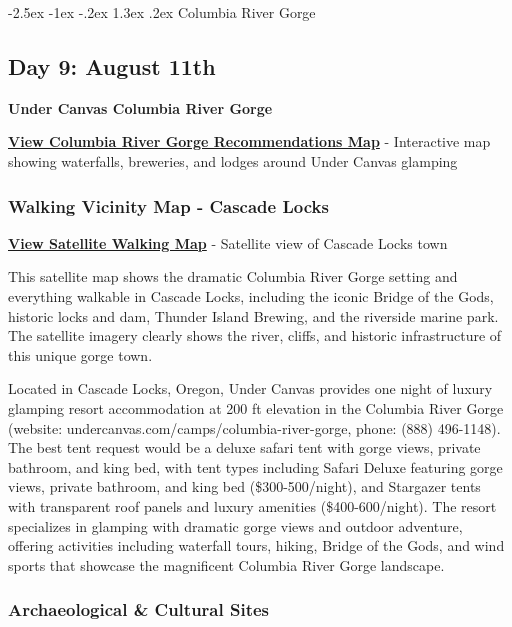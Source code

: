 \documentclass[
  11pt,
  letterpaper,
  DIV=10,
  numbers=noendperiod]{scrartcl}
\makeatletter
\renewcommand{\section}{\@startsection{section}{1}{\z@}%
  {-2.5ex \@plus -1ex \@minus -.2ex}%
  {1.3ex \@plus .2ex}%
  {\normalfont\fontsize{16}{19}\bfseries\color{twinpeaksred}}}
\makeatother
\begin{document}
\newpage

\section{Columbia River Gorge}\label{columbia-river-gorge}

\subsection{Day 9: August 11th}\label{day-9-august-11th}

\textbf{Under Canvas Columbia River Gorge}

\textbf{\href{images/columbia_river_gorge_recommendations_map.html}{View
Columbia River Gorge Recommendations Map}} - Interactive map showing
waterfalls, breweries, and lodges around Under Canvas glamping

\subsubsection{Walking Vicinity Map - Cascade
Locks}\label{walking-vicinity-map---cascade-locks}

\textbf{\href{images/cascade_locks_or_walking_map.html}{View Satellite
Walking Map}} - Satellite view of Cascade Locks town

This satellite map shows the dramatic Columbia River Gorge setting and
everything walkable in Cascade Locks, including the iconic Bridge of the
Gods, historic locks and dam, Thunder Island Brewing, and the riverside
marine park. The satellite imagery clearly shows the river, cliffs, and
historic infrastructure of this unique gorge town.

Located in Cascade Locks, Oregon, Under Canvas provides one night of
luxury glamping resort accommodation at 200 ft elevation in the Columbia
River Gorge (website: undercanvas.com/camps/columbia-river-gorge, phone:
(888) 496-1148). The best tent request would be a deluxe safari tent
with gorge views, private bathroom, and king bed, with tent types
including Safari Deluxe featuring gorge views, private bathroom, and
king bed (\$300-500/night), and Stargazer tents with transparent roof
panels and luxury amenities (\$400-600/night). The resort specializes in
glamping with dramatic gorge views and outdoor adventure, offering
activities including waterfall tours, hiking, Bridge of the Gods, and
wind sports that showcase the magnificent Columbia River Gorge
landscape.

\subsubsection{Archaeological \& Cultural
Sites}\label{archaeological-cultural-sites-4}
\end{document}
